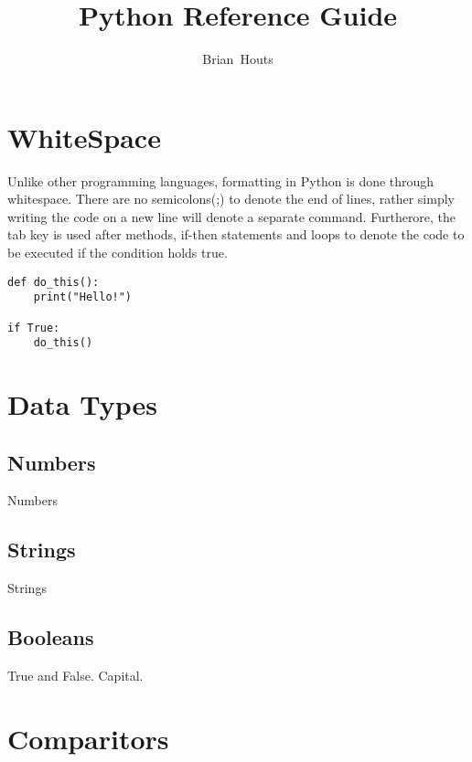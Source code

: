\documentclass[11pt]{ref}
\title{Python Reference Guide}
\author{Brian~Houts}
\date{}
\begin{document}
\maketitle
\tableofcontents
\newpage
\section{WhiteSpace}
Unlike other programming languages, formatting in Python is done through whitespace. There are no semicolons(;) to denote the end of lines, rather simply writing the code on a new line will denote a separate command. Furtherore, the tab key is used after methods, if-then statements and loops to denote the code to be executed if the condition holds true.


\begin{lstlisting}
def do_this():
	print("Hello!")
	
if True:
	do_this()
\end{lstlisting}


\section{Data Types}

\subsection{Numbers}
Numbers
\subsection{Strings}
Strings
\subsection{Booleans}
True and False. Capital.

\section{Comparitors}
\end{document}
